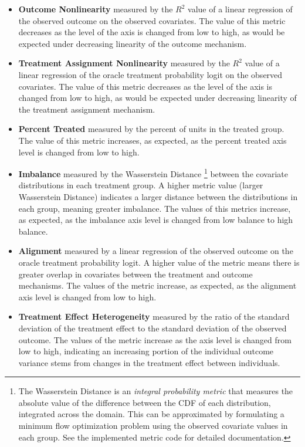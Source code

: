 \documentclass[../main.tex]{subfiles}
\begin{document}
\begin{itemize}
    \item \textbf{Outcome Nonlinearity} measured by the $R^2$ value of a linear regression of the observed outcome on the observed covariates. The value of this metric decreases as the level of the axis is changed from low to high, as would be expected under decreasing linearity of the outcome mechanism.
    
    \item \textbf{Treatment Assignment Nonlinearity} measured by the $R^2$ value of a linear regression of the oracle treatment probability logit on the observed covariates. The value of this metric decreases as the level of the axis is changed from low to high, as would be expected under decreasing linearity of the treatment assignment mechanism.
    
    \item \textbf{Percent Treated} measured by the percent of units in the treated group. The value of this metric increases, as expected, as the percent treated axis level is changed from low to high.
    
    \item \textbf{Imbalance} measured by the Wasserstein Distance \footnote{The Wasserstein Distance is an \textit{integral probability metric} that measures the absolute value of the difference between the CDF of each distribution, integrated across the domain. This can be approximated by formulating a minimum flow optimization problem using the observed covariate values in each group. See the implemented metric code for detailed documentation.} between the covariate distributions in each treatment group. A higher metric value (larger Wasserstein Distance) indicates a larger distance between the distributions in each group, meaning greater imbalance. The values of this metrics increase, as expected, as the imbalance axis level is changed from low balance to high balance. 
    
    \item \textbf{Alignment} measured by a linear regression of the observed outcome on the oracle treatment probability logit. A higher value of the metric means there is greater overlap in covariates between the treatment and outcome mechanisms. The values of the metric increase, as expected, as the alignment axis level is changed from low to high.
    
    \item \textbf{Treatment Effect Heterogeneity} measured by the ratio of the standard deviation of the treatment effect to the standard deviation of the observed outcome. The values of the metric increase as the axis level is changed from low to high, indicating an increasing portion of the individual outcome variance stems from changes in the treatment effect between individuals.
\end{itemize}
\end{document}
